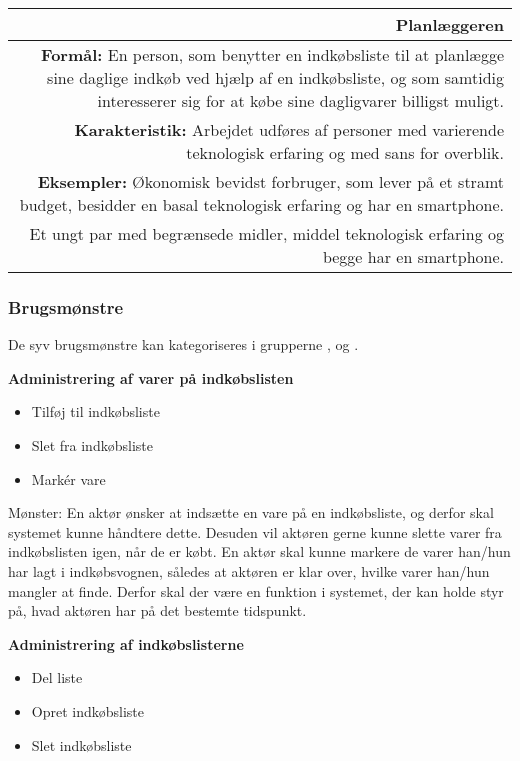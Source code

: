 \begin{table}[H]
    \begin{tabularx}{\textwidth}{R}
    	\hline
        \textbf{Planlæggeren} \\ \hline
        \textbf{Formål:} En person, som benytter en indkøbsliste til at planlægge sine daglige indkøb ved hjælp af en indkøbsliste,
        og som samtidig interesserer sig for at købe sine dagligvarer billigst muligt.\\
        \textbf{Karakteristik:} Arbejdet udføres af personer med varierende teknologisk erfaring og med sans for overblik. \\
        \textbf{Eksempler:} Økonomisk bevidst forbruger, som lever på et stramt budget, besidder en basal teknologisk erfaring og har en smartphone.\\
        Et ungt par med begrænsede midler, middel teknologisk erfaring og begge har en smartphone.
    \end{tabularx}
\end{table}

\subsubsection{Brugsmønstre}

De syv brugsmønstre kan kategoriseres i grupperne ,  og .

\textbf{Administrering af varer på indkøbslisten}

\begin{itemize}
	\item Tilføj til indkøbsliste
	\item Slet fra indkøbsliste
	\item Markér vare 
\end{itemize}

Mønster: En aktør ønsker at indsætte en vare på en indkøbsliste, og derfor skal systemet kunne håndtere dette. Desuden vil aktøren gerne kunne slette varer fra indkøbslisten igen, når de er købt. En aktør skal kunne markere de varer han/hun har lagt i indkøbsvognen, således at aktøren er klar over, hvilke varer han/hun mangler at finde. Derfor skal der være en funktion i systemet, der kan holde styr på, hvad aktøren har  på det bestemte tidspunkt.

\textbf{Administrering af indkøbslisterne}

\begin{itemize}
	\item Del liste
	\item Opret indkøbsliste
	\item Slet indkøbsliste
\end{itemize}

